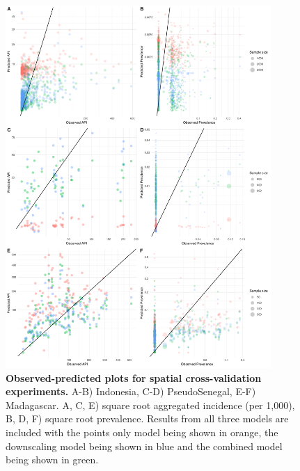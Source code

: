\documentclass[10pt,letterpaper]{article}
\begin{document}
\begin{figure}[!t]
\includegraphics[width = 0.9\textwidth]{figures/spatial_cv_scatter.pdf} %
\caption{{\bf Observed-predicted plots for spatial cross-validation experiments.}
A-B) Indonesia, C-D) PseudoSenegal, E-F) Madagascar. A, C, E) square root aggregated incidence (per 1,000), B, D, F) square root prevalence.
Results from all three models are included with the points only model being shown in orange, the downscaling model being shown in blue and the combined model being shown in green.
}
\label{spatialpredobsscatter}
\end{figure}
\end{document}
